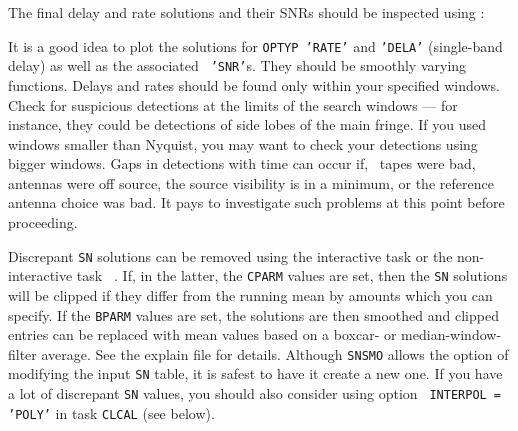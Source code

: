 The final delay and rate solutions and their SNRs should be inspected
using {\tt {}}:
\pd
{}

It is a good idea to plot the solutions for {\tt OPTYP 'RATE'} and
{\tt 'DELA'} (single-band delay) as well as the associated {\tt
'SNR'}s.  They should be smoothly varying functions.  Delays and rates
should be found only within your specified windows.  Check for
suspicious detections at the limits of the search windows --- for
instance, they could be detections of side lobes of the main fringe.
If you used windows smaller than Nyquist, you may want to check your
detections using bigger windows.  Gaps in detections with time can
occur if, \eg\ tapes were bad, antennas were off source, the source
visibility is in a minimum, or the reference antenna choice was bad.
It pays to investigate such problems at this point before proceeding.

Discrepant {\tt SN} solutions can be removed using the interactive
task {\tt {}} or the non-interactive task {\tt
{}}\@.  If, in the latter, the {\tt CPARM} values are set,
then the {\tt SN} solutions will be clipped if they differ from the
running mean by amounts which you can specify.  If the {\tt BPARM}
values are set, the solutions are then smoothed and clipped entries
can be replaced with mean values based on a boxcar- or
median-window-filter average.  See the explain file for details.
Although {\tt SNSMO} allows the option of modifying the input {\tt SN}
table, it is safest to have it create a new one.  If you have a lot of
discrepant {\tt SN} values, you should also consider using option {\tt
INTERPOL = 'POLY'} in task {\tt CLCAL} (see below).

